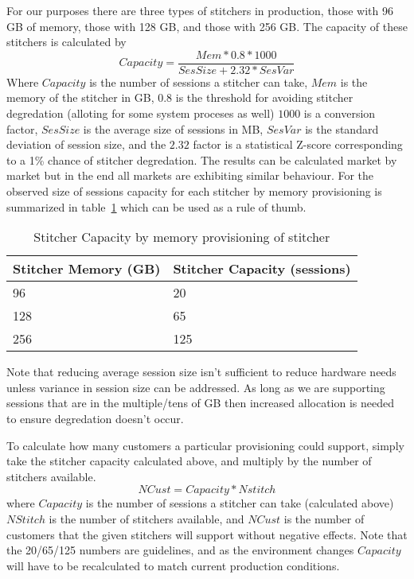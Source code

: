 \documentclass{article}
\begin{document}
For our purposes there are three types of stitchers in production, those with 96 GB of memory, those with 128 GB, and those with 256 GB. The capacity of these stitchers is calculated by $$Capacity=\frac{Mem * 0.8 * 1000}{SesSize + 2.32*SesVar}$$ Where $Capacity$ is the number of sessions a stitcher can take, $Mem$ is the memory of the stitcher in GB, $0.8$ is the threshold for avoiding stitcher degredation (alloting for some system proceses as well) $1000$ is a conversion factor, $SesSize$ is the average size of sessions in MB, $SesVar$ is the standard deviation of session size, and the $2.32$ factor is a statistical Z-score corresponding to a 1\% chance of stitcher degredation. The results can be calculated market by market but in the end all markets are exhibiting similar behaviour. For the observed size of sessions capacity for each stitcher by memory provisioning is summarized in table~\ref{TABLE-StitcherCapacity} which can be used as a rule of thumb.

\begin{table}[H]
\begin{tabular}{|l|l|} 
\hline Stitcher Memory (GB) & Stitcher Capacity (sessions) \\
\hline 96 & 20 \\
\hline 128 & 65 \\
\hline 256 & 125 \\
\hline 
\end{tabular}
\caption{\label{TABLE-StitcherCapacity}Stitcher Capacity by memory provisioning of stitcher}
\end{table}

Note that reducing average session size isn't sufficient to reduce hardware needs unless variance in session size can be addressed. As long as we are supporting sessions that are in the multiple/tens of GB then increased allocation is needed to ensure degredation doesn't occur. 

To calculate how many customers a particular provisioning could support, simply take the stitcher capacity calculated above, and multiply by the number of stitchers available. $$NCust=Capacity*Nstitch$$ where $Capacity$ is the number of sessions a stitcher can take (calculated above) $NStitch$ is the number of stitchers available, and $NCust$ is the number of customers that the given stitchers will support without negative effects. Note that the 20/65/125 numbers are guidelines, and as the environment changes $Capacity$ will have to be recalculated to match current production conditions. 
\end{document}
